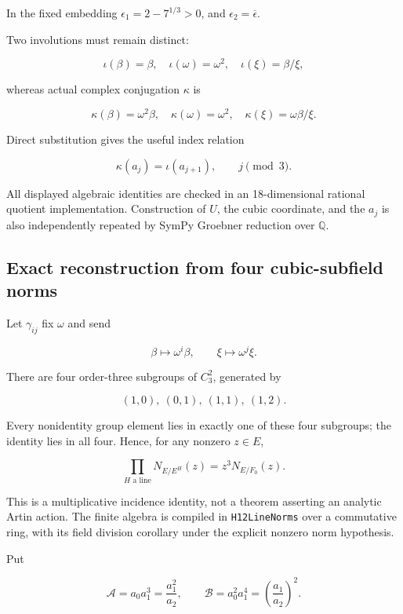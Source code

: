In the fixed embedding \(\epsilon_1=2-7^{1/3}>0\), and
\(\epsilon_2=\overline\epsilon\).

Two involutions must remain distinct:

\[
 \iota(\beta)=\beta,\quad \iota(\omega)=\omega^2,\quad \iota(\xi)=\beta/\xi,
\]

whereas actual complex conjugation \(\kappa\) is

\[
 \kappa(\beta)=\omega^2\beta,\quad \kappa(\omega)=\omega^2,
 \quad \kappa(\xi)=\omega\beta/\xi.
\]

Direct substitution gives the useful index relation

\[
 \boxed{\kappa(a_j)=\iota(a_{j+1})},\qquad j\pmod3. \tag{Q1}
\]

All displayed algebraic identities are checked in an 18-dimensional
rational quotient implementation. Construction of \(U\), the cubic
coordinate, and the \(a_j\) is also independently repeated by SymPy
Groebner reduction over \(\mathbb Q\).

\hypertarget{Q-exact-reconstruction-from-four-cubic-subfield-norms}{%
\subsection{Exact reconstruction from four cubic-subfield
norms}\label{Q-exact-reconstruction-from-four-cubic-subfield-norms}}

Let \(\gamma_{ij}\) fix \(\omega\) and send

\[
 \beta\mapsto\omega^i\beta,\qquad \xi\mapsto\omega^j\xi.
\]

There are four order-three subgroups of \(C_3^2\), generated by

\[
 (1,0),\ (0,1),\ (1,1),\ (1,2).
\]

Every nonidentity group element lies in exactly one of these four
subgroups; the identity lies in all four. Hence, for any nonzero
\(z\in E\),

\[
 \boxed{
 \prod_{H\text{ a line}}N_{E/E^H}(z)
   =z^3N_{E/F_0}(z).
 } \tag{Q2}
\]

This is a multiplicative incidence identity, not a theorem asserting an
analytic Artin action. The finite algebra is compiled in
\texttt{H12LineNorms} over a commutative ring, with its field division
corollary under the explicit nonzero norm hypothesis.

Put

\[
 \mathcal A=a_0a_1^3=\frac{a_1^2}{a_2},\qquad
 \mathcal B=a_0^2a_1^4=\left(\frac{a_1}{a_2}\right)^2.
\]

